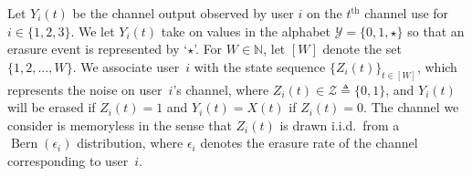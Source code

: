 Let $Y_{i}(t)$ be the channel output observed by user $i$ on the $t^{\mathrm{th}}$ channel use for $i \in \{1, 2, 3\}$. %
We let $Y_{i}(t)$ take on values in the alphabet $\mathcal{Y} = \{0, 1, \star\}$ so that an erasure event is represented by `$\star$'.   
%
For $W \in \mathbb{N}$,  let $[W]$ denote the set $\{1, 2, \ldots, W\}$.  We associate user~$i$ with the state sequence $\{Z_i(t)\}_{t \in [W]}$, which represents the noise on user~$i$'s channel, where $Z_i(t) \in \mathcal{Z} \triangleq \{0,1\}$,  and  $Y_i(t)$ will be erased if $Z_{i}(t) = 1$ and $Y_{i}(t) = X(t)$ if $Z_i(t) = 0$.  The channel we consider is memoryless in the sense that $Z_{i}(t)$ is drawn i.i.d.\ from a $\operatorname{Bern}(\epsilon_{i})$ distribution, where
$\epsilon_i$ denotes the erasure rate of the channel corresponding to user~$i$.

